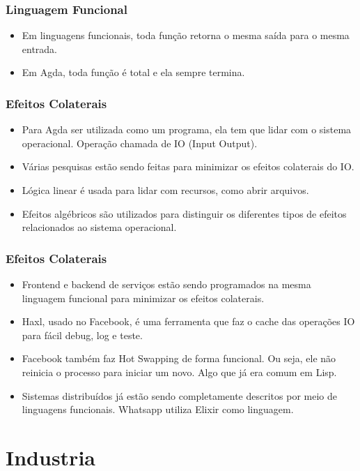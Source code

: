\documentclass{beamer}
\begin{document}
\begin{frame}
\frametitle{Linguagem Funcional}
\begin{itemize}
  \item Em linguagens funcionais, toda função retorna o mesma saída para o mesma entrada.
  \item Em Agda, toda função é total e ela sempre termina.
\end{itemize}
\end{frame}

\begin{frame}
\frametitle{Efeitos Colaterais}
\begin{itemize}
  \item Para Agda ser utilizada como um programa, ela tem que lidar com o sistema operacional.
    Operação chamada de IO (Input Output).
  \item Várias pesquisas estão sendo feitas para minimizar os efeitos colaterais do IO.
  \item Lógica linear é usada para lidar com recursos, como abrir arquivos.
  \item Efeitos algébricos são utilizados para distinguir os diferentes tipos de efeitos
    relacionados ao sistema operacional.
\end{itemize}
\end{frame}

\begin{frame}
\frametitle{Efeitos Colaterais}
\begin{itemize}
  \item Frontend e backend de serviços estão sendo programados na mesma linguagem funcional
    para minimizar os efeitos colaterais.
  \item Haxl, usado no Facebook, é uma ferramenta que faz o cache das operações IO para
    fácil debug, log e teste.
  \item Facebook também faz Hot Swapping de forma funcional.
    Ou seja, ele não reinicia o processo para iniciar um novo.
    Algo que já era comum em Lisp.
  \item Sistemas distribuídos já estão sendo completamente descritos por meio de linguagens funcionais.
    Whatsapp utiliza Elixir como linguagem.
\end{itemize}
\end{frame}

\section{Industria}
\end{document}
